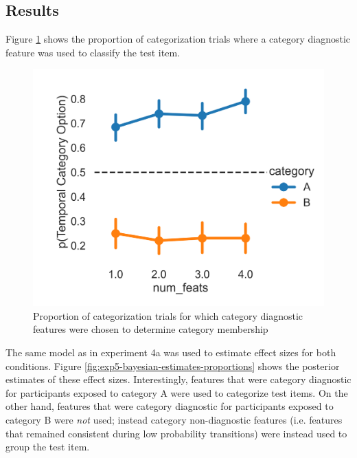 \subsection{Results}
Figure \ref{fig:exp5-category-proportions} shows the proportion of categorization trials where a category diagnostic feature was used to classify the test item. 
\begin{figure}[h]
    \centering
    \includegraphics[width = \textwidth]{chapter_notebooks/chapter_4/figures/exp5_proportion_results.png}
    \caption{Proportion of categorization trials for which category diagnostic features were chosen to determine category membership}
    \label{fig:exp5-category-proportions}
\end{figure}
The same model as in experiment 4a was used to estimate effect sizes for both conditions. Figure \ref{fig:exp5-bayesian-estimates-proportions} shows the posterior estimates of these effect sizes. Interestingly, features that were category diagnostic for participants exposed to category A were used to categorize test items. On the other hand, features that were category diagnostic for participants exposed to category B were \textit{not} used; instead category non-diagnostic features (i.e. features that remained consistent during low probability transitions) were instead used to group the test item. 


